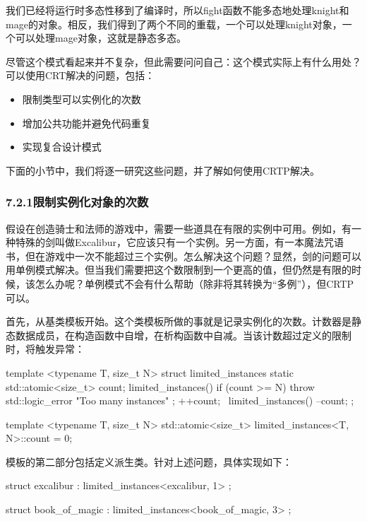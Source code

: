 我们已经将运行时多态性移到了编译时，所以fight函数不能多态地处理knight和mage的对象。相反，我们得到了两个不同的重载，一个可以处理knight对象，一个可以处理mage对象，这就是静态多态。

尽管这个模式看起来并不复杂，但此需要问问自己：这个模式实际上有什么用处？可以使用CRT解决的问题，包括：

\begin{itemize}
\item
限制类型可以实例化的次数

\item
增加公共功能并避免代码重复

\item
实现复合设计模式
\end{itemize}

下面的小节中，我们将逐一研究这些问题，并了解如何使用CRTP解决。

\subsubsection{7.2.1\hspace{0.2cm}限制实例化对象的次数}

假设在创造骑士和法师的游戏中，需要一些道具在有限的实例中可用。例如，有一种特殊的剑叫做Excalibur，它应该只有一个实例。另一方面，有一本魔法咒语书，但在游戏中一次不能超过三个实例。怎么解决这个问题？显然，剑的问题可以用单例模式解决。但当我们需要把这个数限制到一个更高的值，但仍然是有限的时候，该怎么办呢？单例模式不会有什么帮助（除非将其转换为“多例”），但CRTP可以。

首先，从基类模板开始。这个类模板所做的事就是记录实例化的次数。计数器是静态数据成员，在构造函数中自增，在析构函数中自减。当该计数超过定义的限制时，将触发异常：

\begin{cpp}
template <typename T, size_t N>
struct limited_instances
{
	static std::atomic<size_t> count;
	limited_instances()
	{
		if (count >= N)
			throw std::logic_error{ "Too many instances" };
		++count;
	}
	~limited_instances() { --count; }
};

template <typename T, size_t N>
std::atomic<size_t> limited_instances<T, N>::count = 0;
\end{cpp}

模板的第二部分包括定义派生类。针对上述问题，具体实现如下：

\begin{cpp}
struct excalibur : limited_instances<excalibur, 1>
{};

struct book_of_magic : limited_instances<book_of_magic, 3>
{};
\end{cpp}

